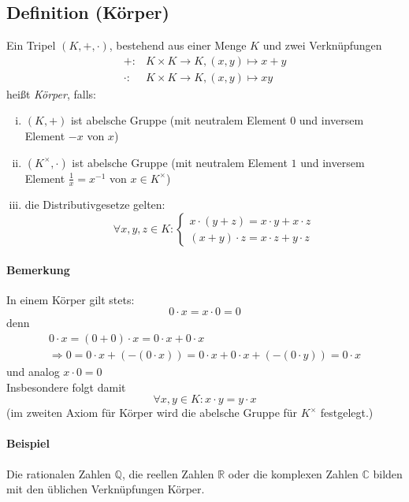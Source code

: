 \subsection{Definition (Körper)}
	\begin{Definition}[Körper]
		Ein Tripel $(K,+,\cdot)$, bestehend aus einer Menge $K$ und zwei Verknüpfungen
                \begin{align*}
                        +:&K\times K\to K,(x,y)\mapsto x+y\\
                        \cdot : &K\times K\to K, (x,y)\mapsto xy
                \end{align*}
                heißt \emph{Körper}, falls:
                \begin{enumerate}[(i)]
                        \item $(K,+)$ ist abelsche Gruppe (mit neutralem Element $0$ und inversem Element $-x$ von $x$)
                        \item $(K^\times,\cdot)$ ist abelsche Gruppe (mit neutralem Element $1$ und inversem Element $\frac{1}{x} = x^{-1}$ von $x\in K^\times$)
                        \item die Distributivgesetze gelten:
                                \[ \forall x,y,z\in K :\begin{cases}x\cdot (y+z) = x\cdot y+x\cdot z\\ (x+y)\cdot z = x\cdot z+y\cdot z \end{cases} \]
                \end{enumerate}
	\end{Definition}

\paragraph{Bemerkung}
	In einem Körper gilt stets:
		\[0\cdot x = x\cdot 0 = 0\]
        denn
		\begin{gather*}
		0\cdot x = (0+0)\cdot x = 0\cdot x + 0\cdot x \\
		\Rightarrow 0 = 0\cdot x + (-(0\cdot x)) = 0\cdot x + 0\cdot x + (-(0\cdot y)) = 0\cdot x
		\end{gather*}
	und analog $x\cdot 0 = 0$\\
	Insbesondere folgt damit 
	\[\forall x,y\in K: x\cdot y = y\cdot x\]
	(im zweiten Axiom für Körper wird die abelsche Gruppe für $K^\times$ festgelegt.)
	
\paragraph{Beispiel}
	Die rationalen Zahlen $\mathbb{Q}$, die reellen Zahlen $\mathbb{R}$ oder die komplexen Zahlen $\mathbb{C}$ bilden mit den üblichen Verknüpfungen Körper.

